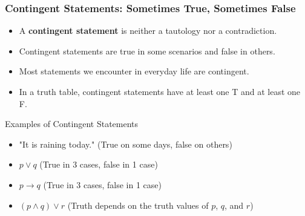 \documentclass{beamer}
\begin{document}
                        \begin{frame}
                            \frametitle{Contingent Statements: Sometimes True, Sometimes False}
                            \begin{itemize}
                                \item A \textbf{contingent statement} is neither a tautology nor a contradiction.
                                \item Contingent statements are true in some scenarios and false in others.
                                \item Most statements we encounter in everyday life are contingent.
                                \item In a truth table, contingent statements have at least one T and at least one F.
                            \end{itemize}
                            
                            \begin{block}{Examples of Contingent Statements}
                                \scriptsize
                            \begin{itemize}
                                \item "It is raining today." (True on some days, false on others)
                                \item $p \vee q$ (True in 3 cases, false in 1 case)
                                \item $p \rightarrow q$ (True in 3 cases, false in 1 case)
                                \item $(p \wedge q) \vee r$ (Truth depends on the truth values of $p$, $q$, and $r$)
                            \end{itemize}
                            \end{block}
                            \end{frame}
                            
\end{document}
